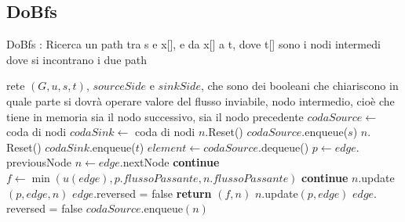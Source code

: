 \documentclass{article}
\begin{document}
\subsection{DoBfs}
\begin{algorithm}
    \caption{DoBfs : Ricerca un path tra s e x[], e da x[] a t, dove t[] sono i nodi intermedi dove si incontrano i due path}
    \begin{algorithmic}[1]
        \REQUIRE rete $(G,u,s,t)$, $sourceSide$ e $sinkSide$, che sono dei booleani che chiariscono in quale parte si dovrà operare
        \ENSURE valore del flusso inviabile, nodo intermedio, cioè che tiene in memoria sia il nodo successivo, sia il nodo precedente
        \STATE $codaSource \leftarrow$ coda di nodi
        \STATE $codaSink \leftarrow$ coda di nodi
        \STATE $n.$Reset()
        \ENDFOR
        \STATE $codaSource.$enqueue($s$)
        \ENDIF
        \STATE $n.$Reset()
        \ENDFOR
        \STATE $codaSink$.enqueue($t$)
        \ENDIF
        \STATE{}
        \STATE $element \leftarrow codaSource$.dequeue()
        \STATE $p \leftarrow edge.$previousNode
        \STATE $n \leftarrow edge.$nextNode
        \STATE \textbf{continue}
        \ELSE
        \STATE $f \leftarrow \min(u(edge),p.flussoPassante,n.flussoPassante)$
        \STATE \textbf{continue}
        \ENDIF
        \STATE $n.$update$(p,edge,n)$
        \STATE $edge.$reversed = false
        \STATE \textbf{return} $(f,n)$
        \ENDIF
        \ENDIF
        \STATE $n.$update$(p,edge)$
        \STATE $edge.$reversed = false
        \STATE $codaSource$.enqueue$(n)$
        \ENDIF
    \end{algorithmic}
\end{algorithm}
\newpage
\end{document}
